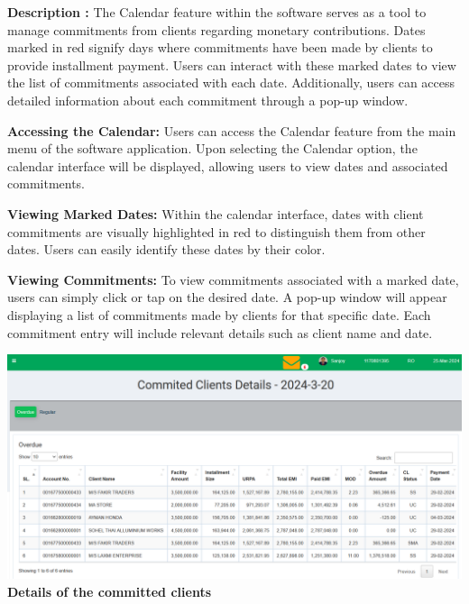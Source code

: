 \documentclass{article}
\begin{document}
\textbf{ Description : }
The Calendar feature within the software serves as a tool to manage commitments from clients regarding monetary contributions. Dates marked in red signify days where commitments have been made by clients to provide installment payment. Users can interact with these marked dates to view the list of commitments associated with each date. Additionally, users can access detailed information about each commitment through a pop-up window.

\textbf{Accessing the Calendar:} Users can access the Calendar feature from the main menu of the software application. Upon selecting the Calendar option, the calendar interface will be displayed, allowing users to view dates and associated commitments.

\textbf{Viewing Marked Dates:} Within the calendar interface, dates with client commitments are visually highlighted in red to distinguish them from other dates. Users can easily identify these dates by their color.

\textbf{Viewing Commitments:} To view commitments associated with a marked date, users can simply click or tap on the desired date. A pop-up window will appear displaying a list of commitments made by clients for that specific date. Each commitment entry will include relevant details such as client name and date.

\begin{center}
\includegraphics[width=.75\textwidth]{image/ro_4_commited_clients_detailspng.png}\\
\textbf {Details of the committed clients}
\end{center}
\end{document}
